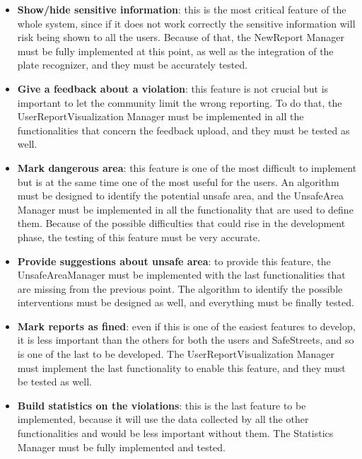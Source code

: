 \documentclass[../RASD.tex]{subfiles}
\begin{document}
\begin{itemize}
        \item \textbf{Show/hide sensitive information}: this is the most critical feature of the whole system, since if it does not work correctly
        the sensitive information will risk being shown to all the users.
        Because of that, the NewReport Manager must be fully implemented at this point, as well as the integration of the plate recognizer,
        and they must be accurately tested.

        \item \textbf{Give a feedback about a violation}: this feature is not crucial but is important to let the community limit the wrong reporting.
        To do that, the UserReportVisualization Manager must be implemented in all the functionalities that concern the feedback upload,
        and they must be tested as well.

        \item \textbf{Mark dangerous area}: this feature is one of the most difficult to implement but is at the same time one of the most useful for the users.
        An algorithm must be designed to identify the potential unsafe area, and the UnsafeArea Manager must be implemented in all the functionality
        that are used to define them.
        Because of the possible difficulties that could rise in the development phase, the testing of this feature must be very accurate.

        \item \textbf{Provide suggestions about unsafe area}: to provide this feature, the UnsafeAreaManager must be implemented with the last functionalities
        that are missing from the previous point.
        The algorithm to identify the possible interventions must be designed as well, and everything must be finally tested.

        \item \textbf{Mark reports as fined}: even if this is one of the easiest features to develop,
        it is less important than the others for both the users and SafeStreets, and so is one of the last to be developed.
        The UserReportVisualization Manager must implement the last functionality to enable this feature, and they must be tested as well.

        \item \textbf{Build statistics on the violations}: this is the last feature to be implemented, because it will use the data collected
        by all the other functionalities and would be less important without them.
        The Statistics Manager must be fully implemented and tested.
    \end{itemize}
\end{document}
